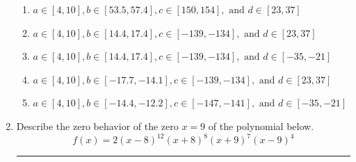 \documentclass[14pt]{extbook}
\newcommand{\litem}[1]{\item#1\hspace*{-1cm}\rule{\textwidth}{0.4pt}}
\begin{document}
\begin{enumerate}
{\begin{enumerate}[label=\Alph*.]
\item \( a \in [4, 10], b \in [53.5, 57.4], c \in [150, 154], \text{ and } d \in [23, 37] \)
\item \( a \in [4, 10], b \in [14.4, 17.4], c \in [-139, -134], \text{ and } d \in [23, 37] \)
\item \( a \in [4, 10], b \in [14.4, 17.4], c \in [-139, -134], \text{ and } d \in [-35, -21] \)
\item \( a \in [4, 10], b \in [-17.7, -14.1], c \in [-139, -134], \text{ and } d \in [23, 37] \)
\item \( a \in [4, 10], b \in [-14.4, -12.2], c \in [-147, -141], \text{ and } d \in [-35, -21] \)

\end{enumerate} }
\litem{
Describe the zero behavior of the zero $x = 9$ of the polynomial below.\[ f(x) = 2(x - 8)^{12}(x + 8)^{8}(x + 9)^{7}(x - 9)^{4} \]\begin{enumerate}[label=\Alph*.]

\end{enumerate}}
\end{enumerate}
\end{document}
